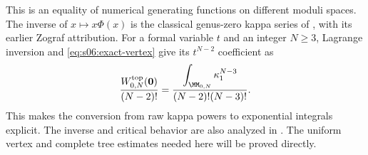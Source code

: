 \begin{rmk}
This is an equality of numerical generating functions on different
moduli spaces. The inverse of $x\mapsto x\Phi(x)$ is the classical
genus-zero kappa series of \cite[(0.8)]{KMZ96v1}, with its earlier
Zograf attribution. For a formal variable $t$ and an integer $N\geq3$,
Lagrange inversion and \eqref{eq:s06:exact-vertex} give its
$t^{N-2}$ coefficient as
\[
 \frac{W^{\rm top}_{0,N}(\mathbf0)}{(N-2)!}
 =\frac{\displaystyle\int_{\MM_{0,N}}\kappa_1^{N-3}}
        {(N-2)!(N-3)!}.
\]
This makes the conversion from raw kappa powers to exponential
integrals explicit. The inverse and critical behavior are also
analyzed in \cite[\S 6, proof of 6.3]{MaZ00}. The uniform vertex
and complete tree estimates needed here will be proved directly.
\end{rmk}
